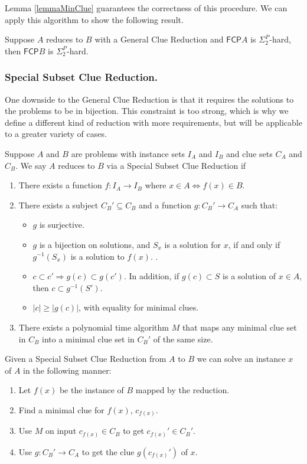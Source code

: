 \documentclass[runningheads,a4paper]{llncs}
\begin{document}
Lemma \ref{lemmaMinClue} guarantees the correctness of this procedure. We can apply this algorithm to show the following result. 

\begin{corollary}
\label{thm:reduction}
Suppose $A$ reduces to $B$ with a General Clue Reduction and $\mathsf{FCP} A$ is $\Sigma_2^P$-hard, then $\mathsf{FCP} B$ is $\Sigma_2^P$-hard. 
\end{corollary}

\subsubsection{Special Subset Clue Reduction.} 

One downside to the General Clue Reduction is that it requires the solutions to the problems to be in bijection. This constraint is too strong, which is why we define a different kind of reduction with more requirements, but will be applicable to a greater variety of cases.

\begin{definition}\label{def:SSCR}
Suppose $A$ and $B$ are problems with instance sets $I_A$ and $I_B$ and clue sets $C_A$ and $C_B$. We say $A$ reduces to $B$ via a Special Subset Clue Reduction if
\begin{enumerate}
\item There exists a function $f: I_A \rightarrow I_B$ where $x \in A \iff f(x) \in B$.
\item There exists a subject $C_B' \subseteq C_B$ and a function $g: C_B' \rightarrow C_A$ such that:
\begin{itemize}
\item $g$ is surjective. 
\item $g$ is a bijection on solutions, and $S_x$ is a solution for $x$, if and only if $g^{-1}(S_x)$ is a solution to $f(x)$. .
\item $c \subset c' \Rightarrow g(c) \subset g(c')$. In addition, if $g(c) \subset S$ is a solution of $x \in A$, then $c \subset g^{-1}(S')$.
\item $|c| \geq |g(c)|$, with equality for minimal clues. 
\end{itemize}
\item There exists a polynomial time algorithm $M$ that maps any minimal clue set in $C_B$ into a minimal clue set in $C_B'$ of the same size. 
\end{enumerate}
\end{definition}

Given a Special Subset Clue Reduction from $A$ to $B$ we can solve an instance $x$ of $A$ in the following manner:
\begin{enumerate}
\item Let $f(x)$ be the instance of $B$ mapped by the reduction.
\item Find a minimal clue for $f(x)$, $c_{f(x)}$. 
\item Use $M$ on input $c_{f(x)} \in C_B$ to get $c_{f(x)}' \in C_B'$. 
\item Use $g: C_B' \rightarrow C_A$ to get the clue $g(c_{f(x)}')$ of $x$.
\end{enumerate}
\end{document}

